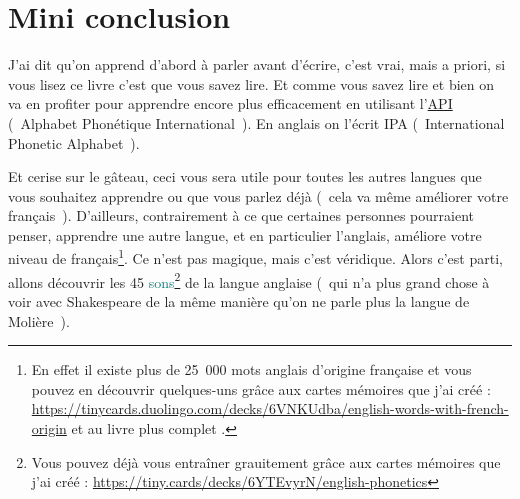 \section{Mini conclusion}\label{sec:mini}
J'ai dit qu'on apprend d'abord à parler avant d'écrire, c'est vrai,
mais a priori, si vous lisez ce livre c'est que vous savez lire. Et
comme vous savez lire et bien on va en profiter pour apprendre encore
plus efficacement en utilisant
l'\href{https://fr.wikipedia.org/wiki/Alphabet\_phon\%25C3\%25A9tique\_international}{API}
(~Alphabet Phonétique International~). En anglais on l'écrit
IPA
(~International Phonetic Alphabet~).\par

Et cerise sur le gâteau, ceci
vous sera utile pour toutes les autres langues que vous souhaitez
apprendre ou que vous parlez déjà (~cela va même améliorer votre
français~). D'ailleurs, contrairement à ce que certaines personnes
pourraient penser, apprendre une autre langue, et en particulier
l'anglais, améliore votre niveau de français\footnote{En effet il existe plus de 25~000 mots anglais
  d'origine française et vous pouvez en découvrir quelques-uns grâce
  aux cartes mémoires que j'ai créé :
  \url{https://tinycards.duolingo.com/decks/6VNKUdba/english-words-with-french-origin}
et au livre plus complet \HSQMYP.}. Ce n'est pas magique,
mais c'est véridique. Alors c'est parti, allons découvrir les 45 \textcolor{teal}{sons}\footnote{Vous pouvez déjà vous entraîner grauitement grâce
  aux cartes mémoires que j'ai créé : \url{https://tiny.cards/decks/6YTEvyrN/english-phonetics}}
de la langue anglaise (~qui n'a plus grand chose à voir avec
Shakespeare de la même manière qu'on ne parle plus la langue de
Molière~).

\newpage
\minitoc
